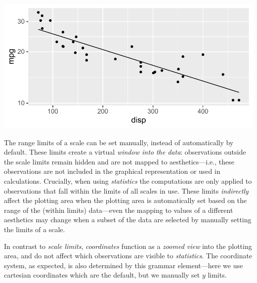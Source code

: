 \documentclass[krantz2]{krantz}\usepackage{knitr}
\begin{document}
\begin{knitrout}\footnotesize
{}\color{fgcolor}\begin{kframe}
\begin{alltt}
\hlstd{(} 
       \hlstd{(}    \hlopt{+}
  \hlstd{()} \hlopt{+}
  \hlstd{(} \hlstd{=} \hlstd{,}  \hlstd{=} \hlstd{,}   \hlopt{~}  \hlopt{+}
  \hlstd{()}
\end{alltt}
\end{kframe}

{\centering \includegraphics[width=.7\textwidth]{figure/pos-ggplot-basics-06-1}

}



\end{knitrout}

The range limits of a scale can be set manually, instead of automatically by default. These limits create a virtual \emph{window into the data}: observations outside the scale limits remain hidden and are not mapped to aesthetics---i.e., these observations are not included in the graphical representation or used in calculations. Crucially, when using \emph{statistics} the computations are only applied to observations that fall within the limits of all scales in use. These limits \emph{indirectly} affect the plotting area when the plotting area is automatically set based on the range of the (within limits) data---even the mapping to values of a different aesthetics may change when a subset of the data are selected by manually setting the limits of a scale.

In contrast to \emph{scale limits}, \emph{coordinates} function as a \emph{zoomed view} into the plotting area, and do not affect which observations are visible to \emph{statistics}. The coordinate system, as expected, is also determined by this grammar element---here we use cartesian coordinates which are the default, but we manually set $y$ limits.
\end{document}
